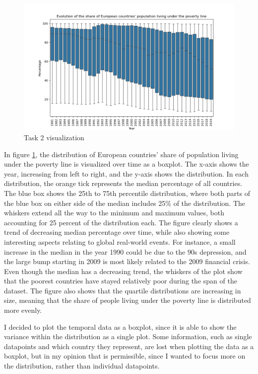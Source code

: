 \documentclass[11pt,a4paper,titlepage]{article}
\begin{document}
\begin{figure}[h]
    \centering
    \includegraphics[width=1.0\linewidth]{reports/assignment-2/imgs/assignment2-2.png}
    \caption{Task 2 visualization}
    \label{fig:viz2}
\end{figure}

In figure \ref{fig:viz2}, the distribution of European countries' share of population living under the poverty line is visualized over time as a boxplot. The x-axis shows the year, increasing from left to right, and the y-axis shows the distribution. In each distribution, the orange tick represents the median percentage of all countries. The blue box shows the 25th to 75th percentile distribution, where both parts of the blue box on either side of the median includes 25\% of the distribution. The whiskers extend all the way to the minimum and maximum values, both accounting for 25 percent of the distribution each. The figure clearly shows a trend of decreasing median percentage over time, while also showing some interesting aspects relating to global real-world events. For instance, a small increase in the median in the year 1990 could be due to the 90s depression, and the large bump starting in 2009 is most likely related to the 2009 financial crisis. Even though the median has a decreasing trend, the whiskers of the plot show that the poorest countries have stayed relatively poor during the span of the dataset. The figure also shows that the quartile distributions are increasing in size, meaning that the share of people living under the poverty line is distributed more evenly.

I decided to plot the temporal data as a boxplot, since it is able to show the variance within the distribution as a single plot. Some information, such as single datapoints and which country they represent, are lost when plotting the data as a boxplot, but in my opinion that is permissible, since I wanted to focus more on the distribution, rather than individual datapoints.
\end{document}
